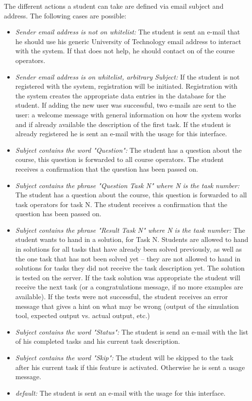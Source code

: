 The different actions a student can take are defined via email subject and address. The following cases
are possible:
\begin{itemize}
\item \textit{Sender email address is not on whitelist:} The student is sent an e-mail that he should use
    his generic University of Technology email address to interact with the system. If that does not help, he 
    should contact on of the course operators.
\item \textit{Sender email address is on whitelist, arbitrary Subject:} If the student is not registered 
    with the system, registration will be initiated. Registration with the system creates the appropriate
    data entries in the database for the student. If adding the new user was successful, two e-mails are 
    sent to the user: a welcome message with general information on how the system works and if already
    available the description of the first task. If the student is already registered he is sent an 
    e-mail with the usage for this interface. 
\item \textit{Subject contains the word "Question":} The student has a question about the course, this 
    question is forwarded to all course operators. The student receives a confirmation that the 
    question has been passed on.
\item \textit{Subject contains the phrase "Question Task N" where N is the task number:} The student 
    has a question about the course, this question is forwarded to all task operators for task N.
    The student receives a confirmation that the question has been passed on.
\item \textit{Subject contains the phrase "Result Task N" where N is the task number:} The student wants 
    to hand in a solution, for Task N. Students are allowed to hand in solutions for all tasks that 
    have already been solved previously, as well as the one task that has not been solved yet -- they
    are not allowed to hand in solutions for tasks they did not receive the task description yet. The
    solution is tested on the server. If the task solution was appropriate the student will receive the
    next task (or a congratulations message, if no more examples are available). If the tests were not
    successful, the student receives an error message that gives a hint on what may be wrong (output of the
    simulation tool, expected output vs. actual output, etc.)
\item \textit{Subject contains the word "Status":} The student is send an e-mail with the list of
    his completed tasks and his current task description.
\item \textit{Subject contains the word "Skip":} The student will be skipped to
	the task after his current task if this feature is activated. Otherwise he
	is sent a usage message.
\item \textit{\textit{default:}} The student is sent an e-mail with the usage for this interface.
\end{itemize}


